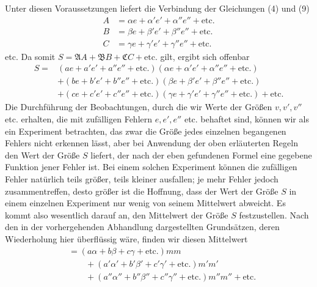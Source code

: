 Unter diesen Voraussetzungen liefert die Verbindung der Gleichungen (4) und (9)
\[
\begin{aligned}
A&=\alpha e+\alpha'e'+\alpha''e''+\text{etc.}\\
B&=\beta e+\beta'e'+\beta''e''+\text{etc.}\\
C&=\gamma e+\gamma'e'+\gamma''e''+\text{etc.}
\end{aligned}
\]
etc. Da somit \(S=\mathfrak A A+\mathfrak B B+\mathfrak C C+\text{etc.}\) gilt, ergibt sich offenbar
\[
\begin{aligned}
S={}&(ae+a'e'+a''e''+\text{etc.})(\alpha e+\alpha'e'+\alpha''e''+\text{etc.})\\
&+(be+b'e'+b''e''+\text{etc.})(\beta e+\beta'e'+\beta''e''+\text{etc.})\\
&+(ce+c'e'+c''e''+\text{etc.})(\gamma e+\gamma'e'+\gamma''e''+\text{etc.})+\text{etc.}
\end{aligned}
\]
Die Durchführung der Beobachtungen, durch die wir Werte der Größen \(v,v',v''\) etc. erhalten, die mit zufälligen Fehlern \(e,e',e''\) etc. behaftet sind, können wir als
ein Experiment betrachten, das zwar die Größe jedes einzelnen begangenen Fehlers nicht erkennen lässt, aber bei Anwendung der oben erläuterten Regeln den Wert der Größe \(S\) liefert, der nach der eben gefundenen Formel eine gegebene Funktion jener Fehler ist. Bei einem solchen Experiment können die zufälligen Fehler natürlich teils größer, teils kleiner ausfallen; je mehr Fehler jedoch zusammentreffen, desto größer ist die Hoffnung, dass der Wert der Größe \(S\) in einem einzelnen Experiment nur wenig von seinem Mittelwert abweicht. Es kommt also wesentlich darauf an, den Mittelwert der Größe \(S\) festzustellen. Nach den in der vorhergehenden Abhandlung dargestellten Grundsätzen, deren Wiederholung hier überflüssig wäre, finden wir diesen Mittelwert
\[
\begin{aligned}
&=(a\alpha+b\beta+c\gamma+\text{etc.})mm\\&\qquad+(a'\alpha'+b'\beta'+c'\gamma'+\text{etc.})m'm'\\
&\qquad+(a''\alpha''+b''\beta''+c''\gamma''+\text{etc.})m''m''+\text{etc.}
\end{aligned}
\]

